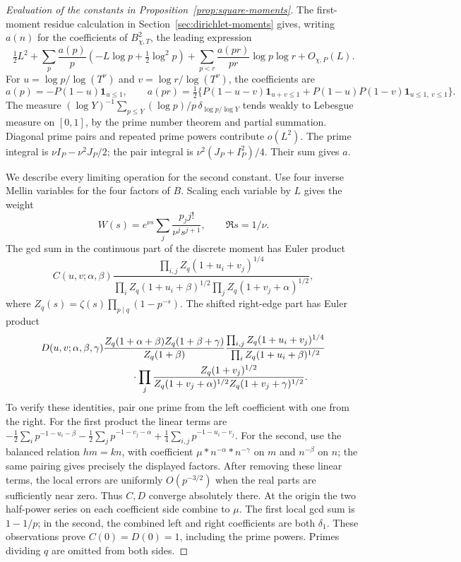 \begin{proof}[Evaluation of the constants in Proposition~\ref{prop:square-moments}]
The first-moment residue calculation in Section~\ref{sec:dirichlet-moments}
gives, writing $a(n)$ for the coefficients of $B_{\chi,T}^2$, the leading
expression
\[
 \tfrac12L^2+\sum_p\frac{a(p)}p
       (-L\log p+\tfrac12\log^2p)
       +\sum_{p<r}\frac{a(pr)}{pr}\log p\log r+O_{\chi,P}(L).
\]
For $u=\log p/\log(T^\nu)$ and $v=\log r/\log(T^\nu)$, the
coefficients are
\[
 a(p)=-P(1-u)\mathbf1_{u\le1},\qquad
 a(pr)=\tfrac12\{P(1-u-v)\mathbf1_{u+v\le1}
       +P(1-u)P(1-v)\mathbf1_{u\le1,\ v\le1}\}.
\]
The measure $(\log Y)^{-1}\sum_{p\le Y}(\log p)/p\,
\delta_{\log p/\log Y}$ tends weakly to Lebesgue measure on $[0,1]$,
by the prime number theorem and partial summation. Diagonal prime
pairs and repeated prime powers contribute $o(L^2)$. The prime
integral is $\nu I_P-\nu^2J_P/2$; the pair integral is
$\nu^2(J_P+I_P^2)/4$. Their sum gives $a$.

We describe every limiting operation for the second constant. Use four
inverse Mellin variables for the four factors of $B$. Scaling each
variable by $L$ gives the weight
\[
 W(s)=e^{\nu s}\sum_j\frac{p_jj!}{\nu^j s^{j+1}},\qquad\Re s=1/\nu.
\]
The gcd sum in the continuous part of the discrete moment has Euler
product
\begin{equation}\label{eq:square-euler-F}
 C(u,v;\alpha,\beta)
 \frac{\prod_{i,j}Z_q(1+u_i+v_j)^{1/4}}
 {\prod_i Z_q(1+u_i+\beta)^{1/2}
       \prod_j Z_q(1+v_j+\alpha)^{1/2}},
\end{equation}
where $Z_q(s)=\zeta(s)\prod_{p\mid q}(1-p^{-s})$. The shifted
right-edge part has Euler product
\begin{align}\label{eq:square-euler-G}
 D(u,v;\alpha,\beta,\gamma)&
 \frac{Z_q(1+\alpha+\beta)Z_q(1+\beta+\gamma)}{Z_q(1+\beta)}
 \frac{\prod_{i,j}Z_q(1+u_i+v_j)^{1/4}}
       {\prod_iZ_q(1+u_i+\beta)^{1/2}}\nonumber\\
 &\hspace{10mm}\cdot\prod_j
 \frac{Z_q(1+v_j)^{1/2}}
 {Z_q(1+v_j+\alpha)^{1/2}Z_q(1+v_j+\gamma)^{1/2}}.
\end{align}
To verify these identities, pair one prime from the left coefficient
with one from the right. For the first product the linear terms are
$-\frac12\sum_i p^{-1-u_i-\beta}
-\frac12\sum_jp^{-1-v_j-\alpha}
+\frac14\sum_{i,j}p^{-1-u_i-v_j}$.
For the second, use the balanced relation $hm=kn$, with coefficient
$\mu*n^{-\alpha}*n^{-\gamma}$ on $m$ and $n^{-\beta}$ on $n$;
the same pairing gives precisely the displayed factors.
After removing these linear terms, the local errors are uniformly
$O(p^{-3/2})$ when the real parts are sufficiently near zero.
Thus $C,D$ converge absolutely there. At the origin the two half-power
series on each coefficient side combine to $\mu$. The first local
gcd sum is $1-1/p$; in the second, the combined left and right
coefficients are both $\delta_1$. These observations prove
$C(0)=D(0)=1$, including the prime powers. Primes dividing $q$ are
omitted from both sides.


\end{proof}
